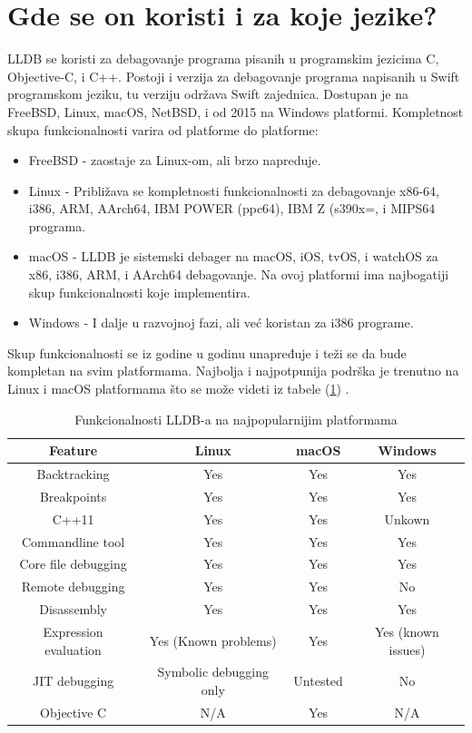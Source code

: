 \documentclass[a4paper]{article}
\begin{document}
\section{Gde se on koristi i za koje jezike? }
\label{sec: Gde se on koristi i za koje jezike?}
LLDB se koristi za debagovanje programa pisanih u programskim jezicima C, Objective-C, i C++. Postoji i verzija za debagovanje programa napisanih u Swift programskom jeziku, tu verziju održava Swift zajednica. 
Dostupan je na FreeBSD, Linux, macOS, NetBSD, i od 2015 na Windows platformi. Kompletnost skupa funkcionalnosti varira od platforme do platforme\cite{lldb_status}:
\begin{itemize}
\item FreeBSD - zaostaje za Linux-om, ali brzo napreduje.
\item Linux - Približava se kompletnosti funkcionalnosti za debagovanje x86-64, i386, ARM, AArch64, IBM POWER (ppc64), IBM Z (s390x=, i MIPS64 programa.
\item macOS - LLDB je sistemski debager na macOS, iOS, tvOS, i watchOS za x86, i386, ARM, i AArch64 debagovanje. Na ovoj platformi ima najbogatiji skup funkcionalnosti koje implementira.
\item Windows - I dalje u razvojnoj fazi, ali već koristan za i386 programe.
\end{itemize}
Skup funkcionalnosti se iz godine u godinu unapređuje i teži se da bude kompletan na svim platformama. Najbolja i najpotpunija podrška je trenutno na Linux i macOS platformama što se može videti iz tabele (\ref{tab:table lldb features}) \cite{lldb_status}.

\begin{table}[h!]
\center
\caption{Funkcionalnosti LLDB-a na najpopularnijim platformama}
\label{tab:table lldb features}
\begin{tabular}{|c|c c c|} 
 \hline
 Feature & Linux & macOS & Windows \\ [0.5ex] 
 \hline
 Backtracking & Yes & Yes & Yes \\ 
 Breakpoints & Yes & Yes & Yes \\
 C++11 & Yes & Yes & Unkown \\
 Commandline tool & Yes & Yes & Yes \\
 Core file debugging  & Yes & Yes & Yes \\
  Remote debugging & Yes & Yes & No\\ [1ex] 
 Disassembly & Yes & Yes & Yes  \\
 Expression evaluation & Yes (Known problems)& Yes & Yes (known issues) \\
 JIT debugging & Symbolic debugging only & Untested & No \\
 Objective C & N/A & Yes & N/A \\
 \hline
\end{tabular}
\end{table}
\end{document}
